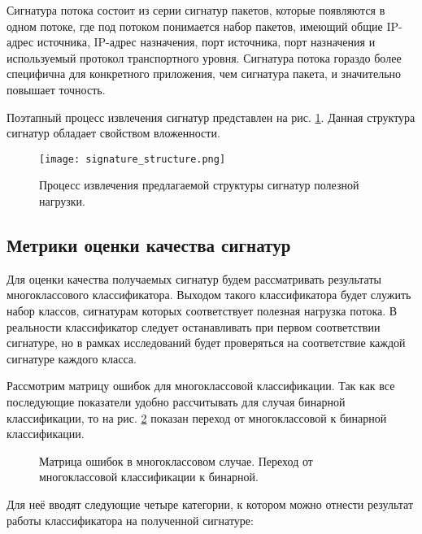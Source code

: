 Сигнатура потока состоит из серии сигнатур пакетов, которые появляются в одном потоке, где под потоком понимается набор пакетов,
имеющий общие IP-адрес источника, IP-адрес назначения, порт источника, порт назначения и
используемый протокол транспортного уровня. Сигнатура потока гораздо более специфична для конкретного приложения,
чем сигнатура пакета, и значительно повышает точность.

Поэтапный процесс извлечения сигнатур представлен на рис. \ref{signature_process}.
Данная структура сигнатур обладает свойством вложенности.

\begin{figure}[H]
    \begin{center}
        \texttt{[image: signature\_structure.png]}
        \caption{Процесс извлечения предлагаемой структуры сигнатур полезной нагрузки.}\label{signature_process}
    \end{center}
\end{figure}

\subsection{Метрики оценки качества сигнатур}

Для оценки качества получаемых сигнатур будем рассматривать результаты многоклассового классификатора.
Выходом такого классификатора будет служить набор классов, сигнатурам которых соответствует полезная нагрузка потока.
В реальности классификатор следует останавливать при первом соответствии сигнатуре,
но в рамках исследований будет проверяться на соответствие каждой сигнатуре каждого класса.

Рассмотрим матрицу ошибок для многоклассовой классификации. Так как все последующие показатели удобно рассчитывать
для случая бинарной классификации, то на рис. \ref{ConfusionMatrix} показан переход от многоклассовой к бинарной классификации.

\begin{figure}[h!]
    \begin{center}
        
        \caption{Матрица ошибок в многоклассовом случае. Переход от многоклассовой классификации к бинарной.} \label{ConfusionMatrix}
    \end{center}
\end{figure}

Для неё вводят следующие четыре категории, к котором можно отнести результат работы классификатора на полученной сигнатуре:

